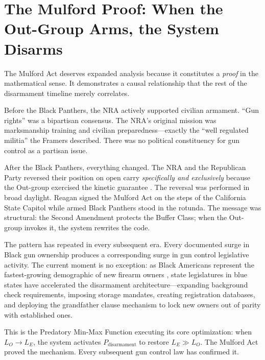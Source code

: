 \section{The Mulford Proof: When the Out-Group Arms, the System Disarms}
\label{sec:mulford_expanded}

The Mulford Act deserves expanded analysis because it constitutes a \textit{proof} in the mathematical sense. It demonstrates a causal relationship that the rest of the disarmament timeline merely correlates.

Before the Black Panthers, the NRA actively supported civilian armament. ``Gun rights'' was a bipartisan consensus. The NRA's original mission was marksmanship training and civilian preparedness---exactly the ``well regulated militia'' the Framers described. There was no political constituency for gun control as a partisan issue.

After the Black Panthers, everything changed. The NRA and the Republican Party reversed their position on open carry \textit{specifically and exclusively} because the Out-group exercised the kinetic guarantee \cite{winkler2011}. The reversal was performed in broad daylight. Reagan signed the Mulford Act on the steps of the California State Capitol while armed Black Panthers stood in the rotunda. The message was structural: the Second Amendment protects the Buffer Class; when the Out-group invokes it, the system rewrites the code.

The pattern has repeated in every subsequent era. Every documented surge in Black gun ownership produces a corresponding surge in gun control legislative activity. The current moment is no exception: as Black Americans represent the fastest-growing demographic of new firearm owners \cite{nssf2020}, state legislatures in blue states have accelerated the disarmament architecture---expanding background check requirements, imposing storage mandates, creating registration databases, and deploying the grandfather clause mechanism to lock new owners out of parity with established ones.

This is the Predatory Min-Max Function executing its core optimization: when $L_O \to L_E$, the system activates $P_{\text{disarmament}}$ to restore $L_E \gg L_O$. The Mulford Act proved the mechanism. Every subsequent gun control law has confirmed it.


